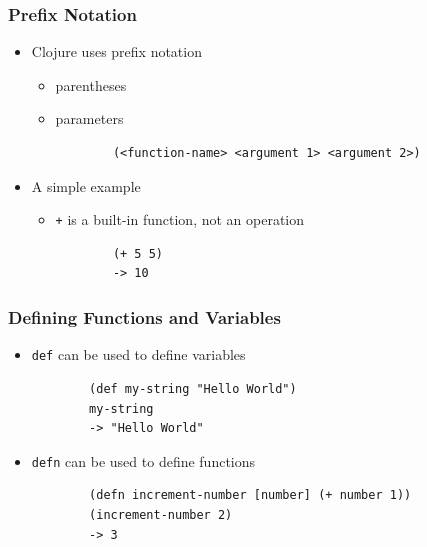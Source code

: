 \documentclass{beamer}
\begin{document}
\begin{frame}[fragile]
\frametitle{Prefix Notation}
	\begin{itemize}
  	 \item Clojure uses prefix notation
  	 \begin{itemize}
  	 	\item parentheses
  	 	\item parameters
  	 \begin{verbatim}
		(<function-name> <argument 1> <argument 2>)
	 \end{verbatim}
	 \end{itemize}
	\end{itemize}
	\begin{itemize}
  	 	\item A simple example
  	 	\begin{itemize}
  	 	 \item \texttt{+} is a built-in function, not an operation
  	 	\begin{verbatim}		
		(+ 5 5)
		-> 10
	    \end{verbatim}
	    \end{itemize}
  	 \end{itemize}
\end{frame}

\begin{frame}[fragile]
\frametitle{Defining Functions and Variables}
	\begin{itemize}
  	 \item \texttt{def} can be used to define variables
  	 \begin{verbatim}
		(def my-string "Hello World")
		my-string
		-> "Hello World"
	\end{verbatim}
	\end{itemize}
	\begin{itemize}
  	 \item \texttt{defn} can be used to define functions
  	 \begin{verbatim}
		(defn increment-number [number] (+ number 1))
		(increment-number 2)
		-> 3
	\end{verbatim}
	\end{itemize}
\end{frame}
\end{document}
